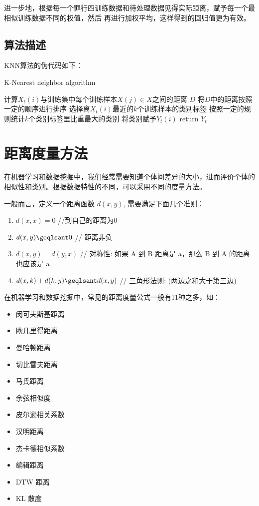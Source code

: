 \documentclass{cugrep}
\begin{document}
进一步地，根据每一个罪行四训练数据和待处理数据见得实际距离，赋予每一个最相似训练数据不同的权值，然后
再进行加权平均，这样得到的回归值更为有效。

\subsection{算法描述}
KNN算法的伪代码如下：
\begin{algorithm}
    \caption{K-Nearest neighbor algorithm}
  {
  	计算$X_{t}(i)$与训练集中每个训练样本$X(j)\in X$之间的距离 $D$\;
	将$D$中的距离按照一定的顺序进行排序\;
	选择离$X_{t}(i)$最近的$k$个训练样本的类别标签\;
	按照一定的规则统计$k$个类别标签里比重最大的类别\;
	将类别赋予$Y_{t}(i)$\;
  }
  return $Y_{t}$\;
\end{algorithm}

\section{距离度量方法}

在机器学习和数据挖掘中，我们经常需要知道个体间差异的大小，进而评价个体的相似性和类别。根据数据特性的不同，可以采用不同的度量方法。

一般而言，定义一个距离函数 $d(x,y)$, 需要满足下面几个准则：
\begin{enumerate}[itemindent=1em]
	\item $d(x,x) = 0$                   \slash\slash 到自己的距离为0
	\item $d(x,y) \geqlsant 0$                  // 距离非负
	\item $d(x,y) = d(y,x)$              // 对称性: 如果 A 到 B 距离是 a，那么 B 到 A 的距离也应该是 a
	\item $d(x,k)+ d(k,y) \geqlsant d(x,y)$     // 三角形法则: (两边之和大于第三边)
\end{enumerate}

在机器学习和数据挖掘中，常见的距离度量公式一般有11种之多，如：
\begin{itemize}[itemindent=1em]
	\item 闵可夫斯基距离
	\item 欧几里得距离
	\item 曼哈顿距离
	\item 切比雪夫距离
	\item 马氏距离
	\item 余弦相似度
	\item 皮尔逊相关系数
	\item 汉明距离
	\item 杰卡德相似系数
	\item 编辑距离
	\item DTW 距离
	\item KL 散度
\end{itemize}
\end{document}

